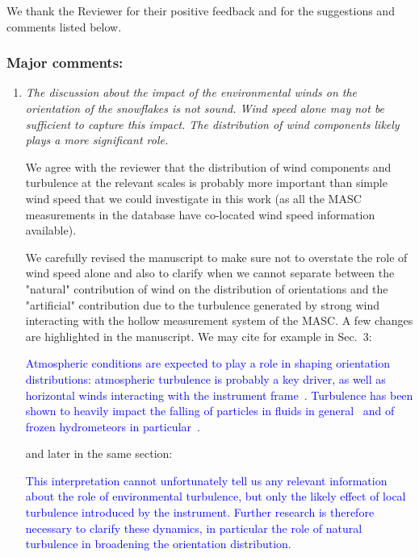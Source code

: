 \documentclass[12pt]{article}
\newcommand*{\blue}{\textcolor{blue}}
\begin{document}
\noindent
We thank the Reviewer for their positive feedback and for the suggestions and comments listed below. 

\subsubsection*{Major comments:}
\begin{enumerate}
    \item \textit{The discussion about the impact of the environmental winds on the orientation of the snowflakes is not sound. Wind speed alone may not be sufficient to capture this impact. The distribution of wind components likely plays a more significant role.}

    We agree with the reviewer that the distribution of wind components and turbulence at the relevant scales is probably more important than simple wind speed that we could investigate in this work (as all the MASC measurements in the database have co-located wind speed information available).
    
    We carefully revised the manuscript to make sure not to overstate the role of wind speed alone and also to clarify when we cannot separate between the "natural" contribution of wind on the distribution of orientations and the "artificial" contribution due to the turbulence generated by strong wind interacting with the hollow measurement system of the MASC. A few changes are highlighted in the manuscript. We may cite for example in Sec.~3:

    \blue{Atmospheric conditions are expected to play a role in shaping orientation distributions: atmospheric turbulence is probably a key driver, as well as horizontal winds interacting with the instrument frame~\cite{Fitch_AMT_2021}. Turbulence has been shown to heavily impact the falling of particles in fluids in general~\cite{Petersen_JFM_2019,Brandt_ARFM_2022} and of frozen hydrometeors in particular~\cite{Nemes_JFM_2017,Li_JFM_2021}.}

    and later in the same section:

    \blue{This interpretation cannot unfortunately tell us any relevant information about the role of environmental turbulence, but only the likely effect of local turbulence introduced by the instrument.  Further research is therefore necessary to clarify these dynamics, in particular the role of natural turbulence in broadening the orientation distribution.}    
\end{enumerate}
\end{document}
